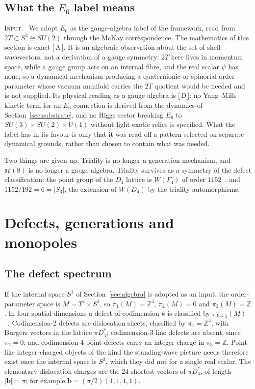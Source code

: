 \documentclass[a4paper,11pt]{article}
\makeatletter
\numberwithin{equation}{section}
\theoremstyle{jsplain}
\theoremstyle{jsrem}
\newcommand{\lbl}[1]{\textcolor{lbl@#1}{\textsc{#1}}.\ }
\newcommand{\grade}[1]{[\,#1\,]}
\makeatother
\begin{document}
\subsection{What the $E_6$ label means}

\lbl{Input} We adopt $E_6$ as the gauge-algebra label of the framework, read from $2T\subset S^3\cong SU(2)$ through the McKay correspondence. The mathematics of this section is exact \grade{A}. It is an algebraic observation about the set of shell wavevectors, not a derivation of a gauge symmetry: $2T$ here lives in momentum space, while a gauge group acts on an internal fibre, and the real scalar $\psi$ has none, so a dynamical mechanism producing a quaternionic or spinorial order parameter whose vacuum manifold carries the $2T$ quotient would be needed and is not supplied. Its physical reading as a gauge algebra is \grade{D}: no Yang--Mills kinetic term for an $E_6$ connection is derived from the dynamics of Section~\ref{sec:substrate}, and no Higgs sector breaking $E_6$ to $SU(3)\times SU(2)\times U(1)$ without light exotic relics is specified. What the label has in its favour is only that it was read off a pattern selected on separate dynamical grounds, rather than chosen to contain what was needed.

Two things are given up. Triality is no longer a generation mechanism, and $\mathfrak{so}(8)$ is no longer a gauge algebra. Triality survives as a symmetry of the defect classification: the point group of the $D_4$ lattice is $W(F_4)$ of order $1152$~\cite{ref6}, and $1152/192=6=|S_3|$, the extension of $W(D_4)$ by the triality automorphisms.

\section{Defects, generations and monopoles}\label{sec:defects}

\subsection{The defect spectrum}

If the internal space $S^3$ of Section~\ref{sec:algebra} is adopted as an input, the order-parameter space is $M=T^4\times S^3$, so $\pi_1(M)=\mathbb{Z}^4$, $\pi_2(M)=0$ and $\pi_3(M)=\mathbb{Z}$. In four spatial dimensions a defect of codimension $k$ is classified by $\pi_{k-1}(M)$~\cite{ref23}. Codimension-2 defects are dislocation sheets, classified by $\pi_1=\mathbb{Z}^4$, with Burgers vectors in the lattice $\pi D_4^*$; codimension-3 line defects are absent, since $\pi_2=0$; and codimension-4 point defects carry an integer charge in $\pi_3=\mathbb{Z}$. Point-like integer-charged objects of the kind the standing-wave picture needs therefore exist once the internal space is $S^3$, which they did not for a single real scalar. The elementary dislocation charges are the $24$ shortest vectors of $\pi D_4^*$, of length $|\mathbf{b}|=\pi$; for example $\mathbf{b}=(\pi/2)(1,1,1,1)$.
\end{document}
